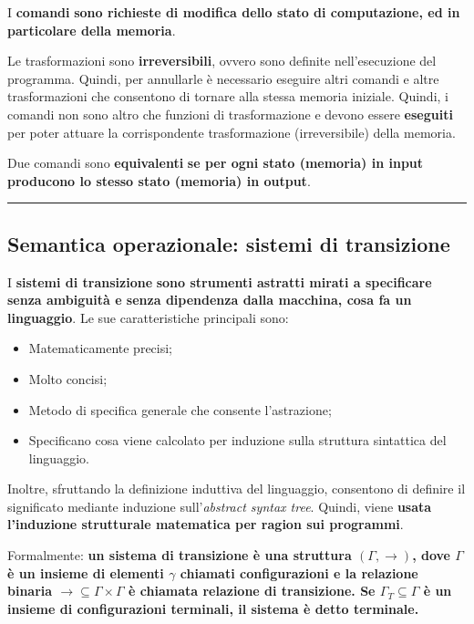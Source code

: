 \documentclass[a4paper]{article}
\newcommand{\longline}{\noindent\rule{\textwidth}{0.4pt}}
\begin{document}
	I \textcolor{Red3}{\textbf{comandi}} \textbf{sono richieste di modifica dello stato di computazione, ed in particolare della memoria}.\newline
	
	\noindent
	Le trasformazioni sono \textbf{irreversibili}, ovvero sono definite nell'esecuzione del programma. Quindi, per annullarle è necessario eseguire altri comandi e altre trasformazioni che consentono di tornare alla stessa memoria iniziale. Quindi, i comandi non sono altro che funzioni di trasformazione e devono essere \textbf{eseguiti} per poter attuare la corrispondente trasformazione (irreversibile) della memoria.
	
	\begin{boxdef}
		Due comandi sono \textcolor{Red3}{\textbf{equivalenti}} \textbf{se per ogni stato (memoria) in input producono lo stesso stato (memoria) in output}.
	\end{boxdef}

	\longline

	\subsection{Semantica operazionale: sistemi di transizione}
	
	I \textcolor{Red3}{\textbf{sistemi di transizione}} \textbf{sono strumenti astratti mirati a specificare senza ambiguità e senza dipendenza dalla macchina, cosa fa un linguaggio}. Le sue caratteristiche principali sono:
	\begin{itemize}
		\item Matematicamente precisi;

		\item Molto concisi;

		\item Metodo di specifica generale che consente l'astrazione;

		\item Specificano cosa viene calcolato per induzione sulla struttura sintattica del linguaggio.
	\end{itemize}
	Inoltre, sfruttando la definizione induttiva del linguaggio, consentono di definire il significato mediante induzione sull'\emph{abstract syntax tree}. Quindi, viene \textbf{usata l'induzione strutturale matematica per ragion sui programmi}.\newline
	
	\noindent
	\begin{boxdef}
		Formalmente: \textbf{un \textcolor{Red3}{sistema di transizione} è una struttura $\left(\Gamma, \rightarrow\right)$, dove $\Gamma$ è un insieme di elementi $\gamma$ chiamati configurazioni e la relazione binaria $\rightarrow \subseteq \Gamma \times \Gamma$ è chiamata relazione di transizione. Se $\Gamma_{T} \subseteq \Gamma$ è un insieme di configurazioni terminali, il sistema è detto terminale.}
	\end{boxdef}\newpage
	
\end{document}
